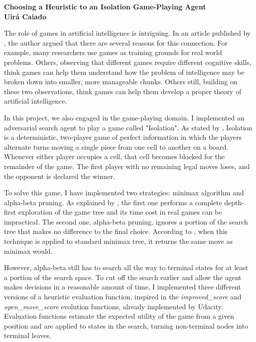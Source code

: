 \documentclass[a4paper]{article}
\begin{document}

\begin{center}

{\bf \large Choosing a Heuristic to an Isolation Game-Playing Agent \\ \small Uirá Caiado}
\end{center}



The role of games in artificial intelligence is intriguing. In an article published by \cite{Economist2017}, the author argued that there are several reasons for this connection. For example, many researchers use games as training grounds for real world problems. Others, observing that different games require different cognitive skills, think games can help them understand how the problem of intelligence may be broken down into smaller, more manageable chunks. Others still, building on these two observations, think games can help them develop a proper theory of artificial intelligence.

In this project, we also engaged in the game-playing domain. I implemented an adversarial search agent to play a game called "Isolation". As stated by \cite{Udacity2017}, Isolation is a deterministic, two-player game of perfect information in which the players alternate turns moving a single piece from one cell to another on a board. Whenever either player occupies a cell, that cell becomes blocked for the remainder of the game. The first player with no remaining legal moves loses, and the opponent is declared the winner.

To solve this game, I have implemented two strategies: minimax algorithm and alpha-beta pruning. As explained by \cite{russelartificial}, the first one performs a complete depth-first exploration of the game tree and its time cost in real games can be impractical. The second one, alpha-beta pruning, ignores a portion of the search tree that makes no difference to the final choice. According to \cite{russelartificial}, when this technique is applied to standard minimax tree, it returns the same move as minimax would.

However, alpha-beta still has to search all the way to terminal states for at least a portion of the search space. To cut off the search earlier and allow the agent makes decisions in a reasonable amount of time, I implemented three different versions of a heuristic evaluation function, inspired in the \textit{improved\_score} and \textit{open\_move\_score} evolution functions, already implemented by Udacity. Evaluation functions estimate the expected utility of the game from a given position and are applied to states in the search,  turning non-terminal nodes into terminal leaves.
\end{document}

